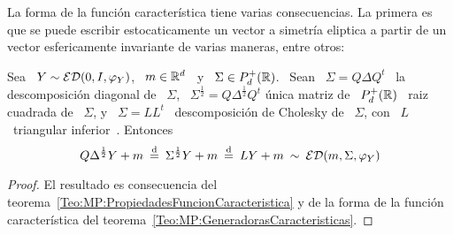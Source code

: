 La forma de la funci\'on caracter\'istica tiene varias consecuencias. La primera
es  que se  puede escribir  estocaticamente un  vector a  simetr\'ia  eliptica a
partir de un vector esfericamente invariante de varias maneras, entre otros:
%
\begin{corolario}
  Sea  \ $Y  \sim  \mathcal{ED}(0,I,\varphi_Y)$, \  $m \in  \mathbb{R}^d$  \ y  \ $\Sigma  \in
  P_d^+(\mathbb{R})$. \ Sean \ $\Sigma = Q \Delta Q^t$ \ la descomposici\'on diagonal
  de \ $\Sigma$, \ $\Sigma^{\frac12} = Q \Delta^{\frac12} Q^t$ \'unica matriz de
  \  $P_d^+(\mathbb{R})$ \  raiz cuadrada  de \  $\Sigma$,  y \  $\Sigma =  L L^t$  \
  descomposici\'on  de  Cholesky   de  \  $\Sigma$,  con  \   $L$  \  triangular
  inferior~\cite{HorJoh13, Bha07}.  Entonces
  \[
  Q \Delta^{\frac12} Y + m \: \stackrel{\mathrm{d}}{=} \:  \Sigma^{\frac12} Y + m \: \stackrel{\mathrm{d}}{=} \: L Y
  + m \: \sim \: \mathcal{ED}(m,\Sigma,\varphi_Y)
  \]
\end{corolario}
%
\begin{proof}
  El             resultado            es             consecuencia            del
  teorema~\ref{Teo:MP:PropiedadesFuncionCaracteristica}  y  de  la forma  de  la
  funci\'on caracter\'istica del teorema~\ref{Teo:MP:GeneradorasCaracteristicas}.
\end{proof}

